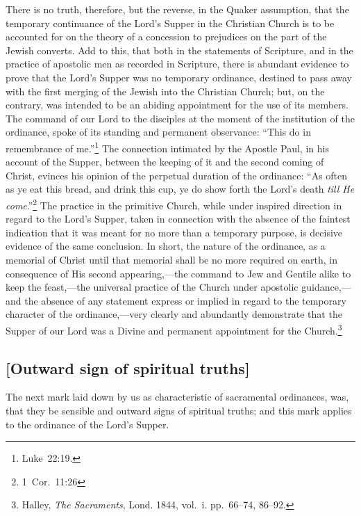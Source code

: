 \documentclass[
  english,
]{book}
\begin{document}
There is no truth, therefore, but the reverse, in the Quaker assumption, that the temporary continuance of the Lord's Supper in the Christian Church is to be accounted for on the theory of a concession to prejudices on the part of the Jewish converts. Add to this, that both in the statements of Scripture, and in the practice of apostolic men as recorded in Scripture, there is abundant evidence to prove that the Lord's Supper was no temporary ordinance, destined to pass away with the first merging of the Jewish into the Christian Church; but, on the contrary, was intended to be an abiding appointment for the use of its members. The command of our Lord to the disciples at the moment of the institution of the ordinance, spoke of its standing and permanent observance: ``This do in remembrance of me.''\footnote{Luke~22:19.} The connection intimated by the Apostle Paul, in his account of the Supper, between the keeping of it and the second coming of Christ, evinces his opinion of the perpetual duration of the ordinance: ``As often as ye eat this bread, and drink this cup, ye do show forth the Lord's death \emph{till He come}.''\footnote{1~Cor.~11:26} The practice in the primitive Church, while under inspired direction in regard to the Lord's Supper, taken in connection with the absence of the faintest indication that it was meant for no more than a temporary purpose, is decisive evidence of the same conclusion. In short, the nature of the ordinance, as a memorial of Christ until that memorial shall be no more required on earth, in consequence of His second appearing,---the command to Jew and Gentile alike to keep the feast,---the universal practice of the Church under apostolic guidance,---and the absence of any statement express or implied in regard to the temporary character of the ordinance,---very clearly and abundantly demonstrate that the Supper of our Lord was a Divine and permanent appointment for the Church.\footnote{Halley, \emph{The Sacraments}, Lond. 1844, vol.~i. pp.~66--74, 86--92.}

\hypertarget{outward-sign-of-spiritual-truths}{%
\subsection{{[}Outward sign of spiritual truths{]}}\label{outward-sign-of-spiritual-truths}}

The next mark laid down by us as characteristic of sacramental ordinances, was, that they be sensible and outward signs of spiritual truths; and this mark applies to the ordinance of the Lord's Supper.
\end{document}
